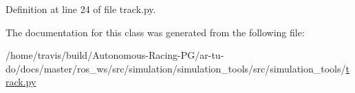 Definition at line 24 of file track.\+py.



The documentation for this class was generated from the following file\+:\begin{DoxyCompactItemize}
\item 
/home/travis/build/\+Autonomous-\/\+Racing-\/\+P\+G/ar-\/tu-\/do/docs/master/ros\+\_\+ws/src/simulation/simulation\+\_\+tools/src/simulation\+\_\+tools/\hyperlink{track_8py}{track.\+py}\end{DoxyCompactItemize}
